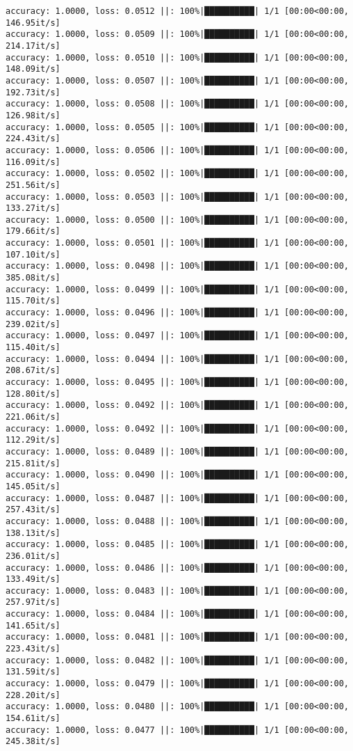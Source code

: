 \documentclass[
]{article}
\begin{document}
\begin{verbatim}
accuracy: 1.0000, loss: 0.0512 ||: 100%|██████████| 1/1 [00:00<00:00, 146.95it/s]
accuracy: 1.0000, loss: 0.0509 ||: 100%|██████████| 1/1 [00:00<00:00, 214.17it/s]
accuracy: 1.0000, loss: 0.0510 ||: 100%|██████████| 1/1 [00:00<00:00, 148.09it/s]
accuracy: 1.0000, loss: 0.0507 ||: 100%|██████████| 1/1 [00:00<00:00, 192.73it/s]
accuracy: 1.0000, loss: 0.0508 ||: 100%|██████████| 1/1 [00:00<00:00, 126.98it/s]
accuracy: 1.0000, loss: 0.0505 ||: 100%|██████████| 1/1 [00:00<00:00, 224.43it/s]
accuracy: 1.0000, loss: 0.0506 ||: 100%|██████████| 1/1 [00:00<00:00, 116.09it/s]
accuracy: 1.0000, loss: 0.0502 ||: 100%|██████████| 1/1 [00:00<00:00, 251.56it/s]
accuracy: 1.0000, loss: 0.0503 ||: 100%|██████████| 1/1 [00:00<00:00, 133.27it/s]
accuracy: 1.0000, loss: 0.0500 ||: 100%|██████████| 1/1 [00:00<00:00, 179.66it/s]
accuracy: 1.0000, loss: 0.0501 ||: 100%|██████████| 1/1 [00:00<00:00, 107.10it/s]
accuracy: 1.0000, loss: 0.0498 ||: 100%|██████████| 1/1 [00:00<00:00, 385.08it/s]
accuracy: 1.0000, loss: 0.0499 ||: 100%|██████████| 1/1 [00:00<00:00, 115.70it/s]
accuracy: 1.0000, loss: 0.0496 ||: 100%|██████████| 1/1 [00:00<00:00, 239.02it/s]
accuracy: 1.0000, loss: 0.0497 ||: 100%|██████████| 1/1 [00:00<00:00, 115.40it/s]
accuracy: 1.0000, loss: 0.0494 ||: 100%|██████████| 1/1 [00:00<00:00, 208.67it/s]
accuracy: 1.0000, loss: 0.0495 ||: 100%|██████████| 1/1 [00:00<00:00, 128.80it/s]
accuracy: 1.0000, loss: 0.0492 ||: 100%|██████████| 1/1 [00:00<00:00, 221.06it/s]
accuracy: 1.0000, loss: 0.0492 ||: 100%|██████████| 1/1 [00:00<00:00, 112.29it/s]
accuracy: 1.0000, loss: 0.0489 ||: 100%|██████████| 1/1 [00:00<00:00, 215.81it/s]
accuracy: 1.0000, loss: 0.0490 ||: 100%|██████████| 1/1 [00:00<00:00, 145.05it/s]
accuracy: 1.0000, loss: 0.0487 ||: 100%|██████████| 1/1 [00:00<00:00, 257.43it/s]
accuracy: 1.0000, loss: 0.0488 ||: 100%|██████████| 1/1 [00:00<00:00, 138.13it/s]
accuracy: 1.0000, loss: 0.0485 ||: 100%|██████████| 1/1 [00:00<00:00, 236.01it/s]
accuracy: 1.0000, loss: 0.0486 ||: 100%|██████████| 1/1 [00:00<00:00, 133.49it/s]
accuracy: 1.0000, loss: 0.0483 ||: 100%|██████████| 1/1 [00:00<00:00, 257.97it/s]
accuracy: 1.0000, loss: 0.0484 ||: 100%|██████████| 1/1 [00:00<00:00, 141.65it/s]
accuracy: 1.0000, loss: 0.0481 ||: 100%|██████████| 1/1 [00:00<00:00, 223.43it/s]
accuracy: 1.0000, loss: 0.0482 ||: 100%|██████████| 1/1 [00:00<00:00, 131.59it/s]
accuracy: 1.0000, loss: 0.0479 ||: 100%|██████████| 1/1 [00:00<00:00, 228.20it/s]
accuracy: 1.0000, loss: 0.0480 ||: 100%|██████████| 1/1 [00:00<00:00, 154.61it/s]
accuracy: 1.0000, loss: 0.0477 ||: 100%|██████████| 1/1 [00:00<00:00, 245.38it/s]

\end{verbatim}
\end{document}
